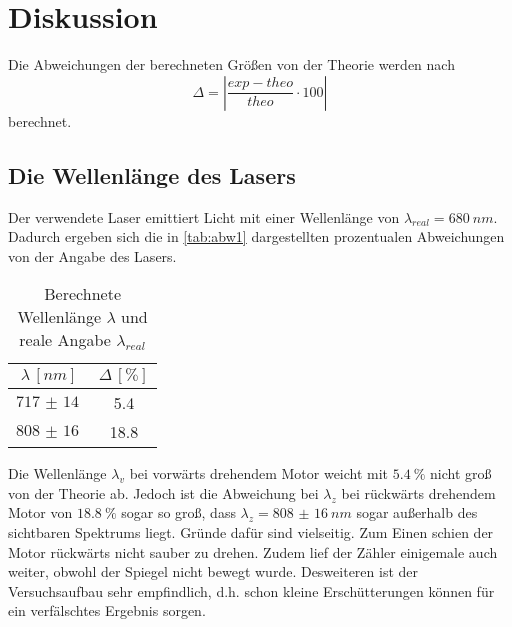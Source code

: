 \section{Diskussion}
\label{sec:Diskussion}
Die Abweichungen der berechneten Größen von der Theorie werden nach 
\begin{equation}\label{1}
    \Delta = |\frac{exp - theo}{theo} \cdot 100|
\end{equation}
berechnet.
\subsection{Die Wellenlänge des Lasers}
Der verwendete Laser emittiert Licht mit einer Wellenlänge von $\lambda_{real} = \SI{680}{nm}$. Dadurch ergeben sich die in \autoref{tab:abw1} dargestellten
prozentualen Abweichungen von der Angabe des Lasers.
\begin{table}[H]
    \centering
    \caption{Berechnete Wellenlänge $\lambda$ und reale Angabe $\lambda_{real}$}
    \begin{tabular}{c c}
        \toprule
        $\lambda \,[\unit{nm}]$ & $\Delta\,[\unit{\%}]$\\
        \midrule
        $\SI{717(14)}{}$ & 5.4\\
        $\SI{808(16)}{}$ & 18.8\\
        \bottomrule
    \end{tabular}
    \label{tab:abw1}
\end{table}
Die Wellenlänge $\lambda_v$ bei vorwärts drehendem Motor weicht mit $\SI{5.4}{\%}$ nicht groß von der Theorie ab. Jedoch ist die Abweichung bei $\lambda_z$ bei rückwärts
drehendem Motor von $\SI{18.8}{\%}$ sogar so groß, dass $\lambda_z = \SI{808(16)}{nm}$ sogar außerhalb des sichtbaren Spektrums liegt.
Gründe dafür sind vielseitig. Zum Einen schien der Motor rückwärts nicht sauber zu drehen. Zudem lief der Zähler einigemale auch weiter, obwohl der Spiegel nicht bewegt wurde.
Desweiteren ist der Versuchsaufbau sehr empfindlich, d.h. schon kleine Erschütterungen können für ein verfälschtes Ergebnis sorgen.

